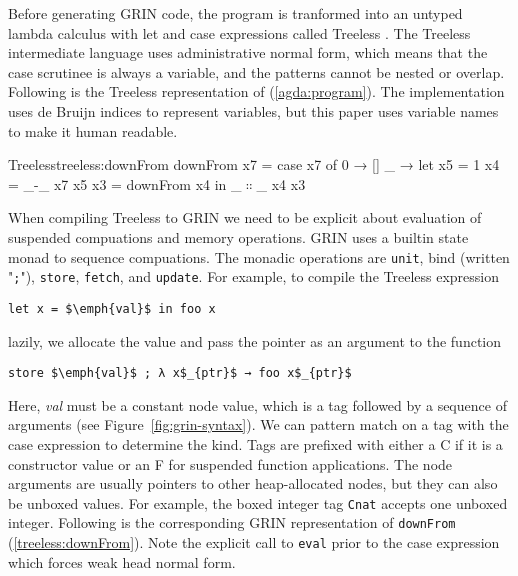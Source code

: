 \documentclass[9pt, twocolumn]{article}
\newcommand{\refp}[1]{(\ref{#1})}
\begin{document}
Before generating GRIN code, the program is tranformed into an untyped lambda calculus with let and case expressions called Treeless \citep{hausmann2015}.
The Treeless intermediate language uses administrative normal form, which means that the case scrutinee is always a variable, and the patterns cannot be nested or overlap.
Following is the Treeless representation of  \refp{agda:program}.
The implementation uses de Bruijn indices to represent variables, but this paper uses variable names to make it \mbox{human} readable. 

\begin{typewriter}{Treeless}{treeless:downFrom}
downFrom x7 = case x7 of
  0 → []
  _ → let x5 = 1
          x4 = _-_ x7 x5
          x3 = downFrom x4 in 
      _$∷$_ x4 x3
\end{typewriter}


When compiling Treeless to GRIN we need to be explicit about evaluation of suspended compuations and memory operations.
GRIN uses a builtin state monad to sequence compuations. 
The monadic operations are \lstinline{unit}, bind (written "\lstinline{;}"), \lstinline{store}, \lstinline{fetch}, and \lstinline{update}. 
For example, to compile the Treeless expression
\begin{lstlisting}[language=Treeless, xleftmargin=1em]
let x = $\emph{val}$ in foo x
\end{lstlisting}
lazily, we allocate the value and pass the pointer as an argument to the function
\begin{lstlisting}[language=GRIN, xleftmargin=1em]
store $\emph{val}$ ; λ x$_{ptr}$ → foo x$_{ptr}$
\end{lstlisting}
Here, \emph{val} must be a constant node value, which is a tag followed by a sequence of arguments (see \mbox{Figure \ref{fig:grin-syntax}}). 
We can pattern match on a tag with the case expression to determine the kind.
Tags are prefixed with either a C if it is a constructor value or an F for suspended function applications.
The node arguments are usually pointers to other heap-allocated nodes, but they can also be unboxed values.
For example, the boxed integer tag \lstinline{Cnat} accepts one unboxed integer.
Following is the corresponding GRIN representation of \lstinline{downFrom} \refp{treeless:downFrom}.
Note the explicit call to \lstinline{eval} prior to the case expression which forces weak head normal form.
\end{document}
